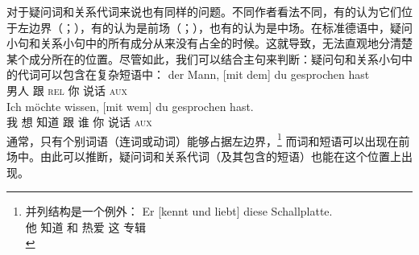 对于疑问词和关系代词来说也有同样的问题。不同作者看法不同，有的认为它们位于左边界（\citealp{Kathol2001a}；\citealp[]{Eisenberg2004a}），有的认为是前场（\citealp[§1345]{Duden2005-Authors}；\citealp[--30, \S~3.1]{Woellstein2010a-u}），也有的认为是中场\citep[]{AH2004a-u}。在标准德语中，疑问小句和关系小句中的所有成分从来没有占全的时候。这就导致，无法直观地分清楚某个成分所在的位置。尽管如此，我们可以结合主句来判断：疑问句和关系小句中的代词可以包含在复杂短语中：
\eal
\ex 
\gll der Mann,         [mit dem] du gesprochen hast\\
      男人 \spacebr{}跟 \textsc{rel} 你 说话 \textsc{aux}\\
\ex 
\gll Ich möchte wissen, [mit wem] du gesprochen hast.\\
     我 想 知道 \spacebr{}跟 谁 你 说话 \textsc{aux}\\
\zl
通常，只有个别词语（连词或动词）能够占据左边界，\footnote{%
 并列结构是一个例外：
\ea
\gll Er [kennt und liebt] diese Schallplatte.\\
     他 \spacebr{}知道 和 热爱 这 专辑\\
\z
} 
而词和短语可以出现在前场中。由此可以推断，疑问词和关系代词（及其包含的短语）也能在这个位置上出现。

